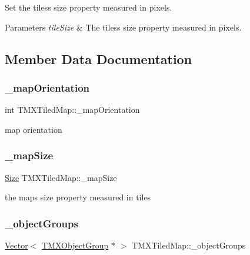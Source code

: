 Set the tiles\textquotesingle{}s size property measured in pixels.


\begin{DoxyParams}{Parameters}
{\em tile\+Size} & The tiles\textquotesingle{}s size property measured in pixels. \\
\hline
\end{DoxyParams}


\subsection{Member Data Documentation}
\mbox{\label{classTMXTiledMap_ae696c0e5c2befb7cc07d2542353a36a2}} 
\subsubsection{\texorpdfstring{\+\_\+map\+Orientation}{\_mapOrientation}}
{\footnotesize\ttfamily int T\+M\+X\+Tiled\+Map\+::\+\_\+map\+Orientation\hspace{0.3cm}{\ttfamily [protected]}}

map orientation \mbox{\label{classTMXTiledMap_a75abce1666e8430273ef914243e554e2}} 
\subsubsection{\texorpdfstring{\+\_\+map\+Size}{\_mapSize}}
{\footnotesize\ttfamily \hyperlink{classSize}{Size} T\+M\+X\+Tiled\+Map\+::\+\_\+map\+Size\hspace{0.3cm}{\ttfamily [protected]}}

the map\textquotesingle{}s size property measured in tiles \mbox{\label{classTMXTiledMap_a4f95a1b37b1b0ac9d953b7fb5f2b4d1a}} 
\subsubsection{\texorpdfstring{\+\_\+object\+Groups}{\_objectGroups}}
{\footnotesize\ttfamily \hyperlink{classVector}{Vector}$<$ \hyperlink{classTMXObjectGroup}{T\+M\+X\+Object\+Group} $\ast$ $>$ T\+M\+X\+Tiled\+Map\+::\+\_\+object\+Groups\hspace{0.3cm}{\ttfamily [protected]}}

